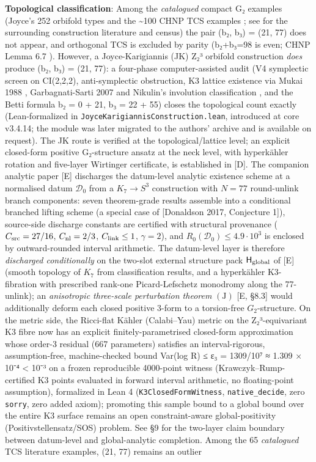\documentclass[11pt,a4paper]{article}
\begin{document}
\textbf{Topological classification}: Among the \emph{catalogued} compact G₂ examples (Joyce's 252 orbifold types \cite{20} and the \textasciitilde100 CHNP TCS examples \cite{21,22}; see \cite{12,14,15} for the surrounding construction literature and census) the pair (b₂, b₃) = (21, 77) does not appear, and orthogonal TCS is excluded by parity (b₂+b₃=98 is even; CHNP Lemma 6.7 \cite{22}). However, a Joyce-Karigiannis (JK) Z₂³ orbifold construction \cite{43} \emph{does} produce (b₂, b₃) = (21, 77): a four-phase computer-assisted audit (V4 symplectic screen on CI(2,2,2), anti-symplectic obstruction, K3 lattice existence via Mukai 1988 \cite{44}, Garbagnati-Sarti 2007 \cite{45} and Nikulin's involution classification \cite{51}, and the Betti formula b₂ = 0 + 21, b₃ = 22 + 55) closes the topological count exactly (Lean-formalized in \texttt{Joyce\allowbreak{}Karigiannis\allowbreak{}Construction.\allowbreak{}lean}, introduced at core v3.4.14; the module was later migrated to the authors' archive and is available on request). The JK route is verified at the topological/lattice level; an explicit closed-form positive G₂-structure ansatz at the neck level, with hyperkähler rotation and five-layer Wirtinger certificate, is established in {[}D{]}. The companion analytic paper {[}E{]} discharges the datum-level analytic existence scheme at a normalised datum \(\mathcal D_0\) from a \(K_7 \to S^3\) construction with \(N = 77\) round-unlink branch components: seven theorem-grade results assemble into a conditional branched lifting scheme (a special case of {[}Donaldson 2017, Conjecture 1{]}), source-side discharge constants are certified with structural provenance (\(C_{\rm src} = 27/16\), \(C_{\rm nl} = 2/3\), \(C_{\rm link} \le 1\), \(\gamma = 2\)), and \(R_0(\mathcal D_0) \le 4.9 \cdot 10^3\) is enclosed by outward-rounded interval arithmetic. The datum-level layer is therefore \emph{discharged conditionally} on the two-slot external structure pack \(\mathsf H_{\rm global}\) of {[}E{]} (smooth topology of \(K_7\) from classification results, and a hyperkähler K3-fibration with prescribed rank-one Picard-Lefschetz monodromy along the 77-unlink); an \emph{anisotropic three-scale perturbation theorem} \((\mathrm J)\) {[}E, §8.3{]} would additionally deform each closed positive \(3\)-form to a torsion-free \(G_2\)-structure. On the metric side, the Ricci-flat Kähler (Calabi--Yau) metric on the Z₂³-equivariant K3 fibre now has an explicit finitely-parametrised closed-form approximation whose order-3 residual (667 parameters) satisfies an interval-rigorous, assumption-free, machine-checked bound Var(log R) ≤ ε₃ = 1309/10⁷ ≈ 1.309 × 10⁻⁴ \textless{} 10⁻³ on a frozen reproducible 4000-point witness (Krawczyk--Rump-certified K3 points evaluated in forward interval arithmetic, no floating-point assumption), formalized in Lean 4 (\texttt{K3Closed\allowbreak{}Form\allowbreak{}Witness}, \texttt{native\_\allowbreak{}decide}, zero \texttt{sorry}, zero added axiom); promoting this sample bound to a global bound over the entire K3 surface remains an open constraint-aware global-positivity (Positivstellensatz/SOS) problem. See §9 for the two-layer claim boundary between datum-level and global-analytic completion. Among the 65 \emph{catalogued} TCS literature examples, (21, 77) remains an outlier 
\end{document}
